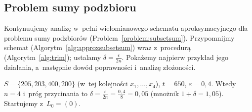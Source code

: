 \subsection{Problem sumy podzbioru} \label{subsec:subsetsum-cd}

Kontynuujemy analizę w~pełni wielomianowego schematu aproksymacyjnego dla problemu sumy podzbiorów (Problem~\ref{problem:subsetsum}). Przypomnijmy schemat  (Algorytm~\ref{alg:approxsubsetsum}) wraz z~procedurą  (Algorytm~\ref{alg:trim}); ustalamy $\delta = \frac{\epsilon}{2n}$. Pokażemy najpierw przykład jego działania, a~następnie dowód poprawności i~analizę złożoności.

\begin{example}
	$S = \{205, 203, 400, 200\}$ (w~tej kolejności $x_1, \ldots, x_4$), $t = 650$, $\varepsilon = 0{,}4$. Wtedy $n = 4$ i~próg przycinania to $\delta = \frac{\varepsilon}{2n} = \frac{0{,}4}{8} = 0{,}05$ (mnożnik $1 + \delta = 1{,}05$). Startujemy z~$L_0 = (0)$.


\end{example}
